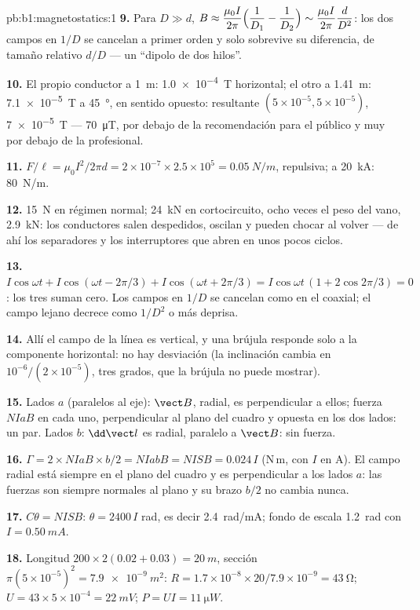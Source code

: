 \begin{solution}{pb:b1:magnetostatics:1}
\textbf{9.} Para $D \gg d$, $B \approx \dfrac{\mu_0I}{2\pi}\Bigl(\dfrac1{D_1} - \dfrac1{D_2}\Bigr)
\sim \dfrac{\mu_0I}{2\pi}\dfrac{d}{D^2}$: los dos campos en $1/D$ se cancelan a
primer orden y solo sobrevive su diferencia, de tamaño relativo $d/D$ --- un
``dipolo de dos hilos''.

\textbf{10.} El propio conductor a \qty{1}{m}: \qty{1.0e-4}{T} horizontal; el otro
a \qty{1.41}{m}: \qty{7.1e-5}{T} a \qty{45}{\degree}, en sentido opuesto: resultante
$(5 \times 10^{-5}, 5 \times 10^{-5})$, \qty{7e-5}{T} --- \qty{70}{\micro T}, por debajo de la
recomendación para el público y muy por debajo de la profesional.

\textbf{11.} $F/\ell = \mu_0I^2/2\pi d = 2 \times 10^{-7} \times 2.5 \times 10^5 =
\qty{0.05}{N/m}$, repulsiva; a \qty{20}{kA}: \qty{80}{N/m}.

\textbf{12.} \qty{15}{N} en régimen normal; \qty{24}{kN} en cortocircuito, ocho veces
el peso del vano, \qty{2.9}{kN}: los conductores salen despedidos, oscilan
y pueden chocar al volver --- de ahí los separadores y los interruptores que
abren en unos pocos ciclos.

\textbf{13.} $I\cos\omega t + I\cos(\omega t - 2\pi/3) + I\cos(\omega t + 2\pi/3) =
I\cos\omega t\,(1 + 2\cos2\pi/3) = 0$: los tres  suman cero. Los
campos en $1/D$ se cancelan como en el coaxial; el campo lejano decrece como $1/D^2$ o
más deprisa.

\textbf{14.} Allí el campo de la línea es vertical, y una brújula responde
solo a la componente horizontal: no hay desviación (la inclinación cambia en
$10^{-6}/(2 \times 10^{-5})$, tres grados, que la brújula no puede mostrar).

\textbf{15.} Lados $a$ (paralelos al eje): $\vect B$, radial, es
perpendicular a ellos; fuerza $NIaB$ en cada uno, perpendicular al plano
del cuadro y opuesta en los dos lados: un par. Lados $b$: $\dd\vect l$
es radial, paralelo a $\vect B$: sin fuerza.

\textbf{16.} $\Gamma = 2 \times NIaB \times b/2 = NIabB = NISB = 0.024\,I$ (N\,m, con $I$
en A). El campo radial está siempre en el plano del cuadro y es
perpendicular a los lados $a$: las fuerzas son siempre normales al plano y
su brazo $b/2$ no cambia nunca.

\textbf{17.} $C\theta = NISB$: $\theta = 2400\,I$ rad, es decir \qty{2.4}{rad/mA}; fondo
de escala \qty{1.2}{rad} con $I = \qty{0.50}{mA}$.

\textbf{18.} Longitud $200 \times 2(0.02 + 0.03) = \qty{20}{m}$, sección $\pi(5 \times
10^{-5})^2 = \qty{7.9e-9}{m^2}$: $R = 1.7 \times 10^{-8} \times 20/7.9 \times 10^{-9} =
\qty{43}{\ohm}$; $U = 43 \times 5 \times 10^{-4} = \qty{22}{mV}$; $P = UI = \qty{11}{\micro W}$.


\end{solution}
